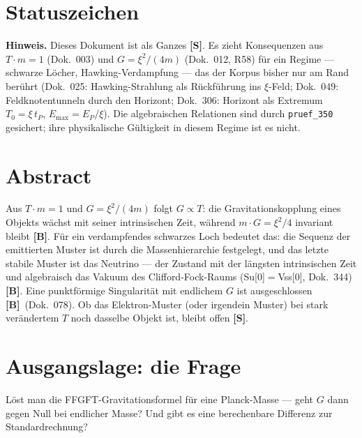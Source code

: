 
\providecommand{\BM}{\textbf{[B]}}
\providecommand{\KM}{\textbf{[K]}}
\providecommand{\SM}{\textbf{[S]}}

{}

\section*{Statuszeichen}


\textbf{Hinweis.} Dieses Dokument ist als Ganzes \SM. Es zieht Konsequenzen
aus $T\cdot m=1$ (Dok.~003) und $G=\xi^2/(4m)$ (Dok.~012, R58) für ein
Regime --- schwarze Löcher, Hawking-Verdampfung --- das der Korpus bisher
nur am Rand berührt (Dok.~025: Hawking-Strahlung als Rückführung ins
$\xi$-Feld; Dok.~049: Feldknotentunneln durch den Horizont; Dok.~306:
Horizont als Extremum $T_0=\xi\,t_P$, $E_\text{max}=E_P/\xi$). Die
algebraischen Relationen sind durch \texttt{pruef\_350} gesichert; ihre
physikalische Gültigkeit in diesem Regime ist es nicht.

\section*{Abstract}

Aus $T\cdot m=1$ und $G=\xi^2/(4m)$ folgt $G\propto T$: die
Gravitationskopplung eines Objekts wächst mit seiner intrinsischen Zeit,
während $m\cdot G=\xi^2/4$ invariant bleibt \BM. Für ein verdampfendes
schwarzes Loch bedeutet das: die Sequenz der emittierten Muster ist durch
die Massenhierarchie festgelegt, und das letzte stabile Muster ist das
Neutrino --- der Zustand mit der längsten intrinsischen Zeit und
algebraisch das Vakuum des Clifford-Fock-Raums (Su[0]$=$Vss[0], Dok.~344)
\BM. Eine punktförmige Singularität mit endlichem $G$ ist ausgeschlossen
\BM\ (Dok.~078). Ob das Elektron-Muster (oder irgendein Muster) bei stark verändertem
$T$ noch dasselbe Objekt ist, bleibt offen \SM.

\section{Ausgangslage: die Frage}

Löst man die FFGFT-Gravitationsformel für eine Planck-Masse --- geht $G$
dann gegen Null bei endlicher Masse? Und gibt es eine berechenbare
Differenz zur Standardrechnung?

